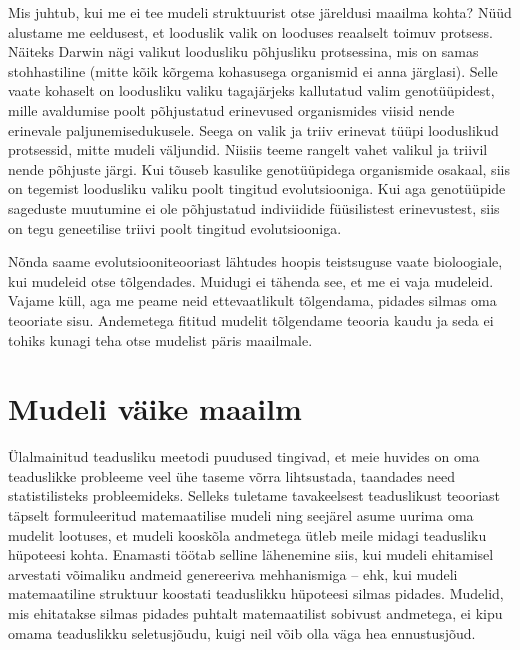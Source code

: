 \documentclass[]{book}
\begin{document}
Mis juhtub, kui me ei tee mudeli struktuurist otse järeldusi maailma kohta? Nüüd alustame me eeldusest, et looduslik valik on looduses reaalselt toimuv protsess.
Näiteks Darwin nägi valikut loodusliku põhjusliku protsessina, mis on samas stohhastiline (mitte kõik kõrgema kohasusega organismid ei anna järglasi).
Selle vaate kohaselt on loodusliku valiku tagajärjeks kallutatud valim genotüüpidest, mille avaldumise poolt põhjustatud erinevused organismides viisid nende erinevale paljunemisedukusele.
Seega on valik ja triiv erinevat tüüpi looduslikud protsessid, mitte mudeli väljundid.
Niisiis teeme rangelt vahet valikul ja triivil nende põhjuste järgi. Kui tõuseb kasulike genotüüpidega organismide osakaal, siis on tegemist loodusliku valiku poolt tingitud evolutsiooniga.
Kui aga genotüüpide sageduste muutumine ei ole põhjustatud indiviidide füüsilistest erinevustest, siis on tegu geneetilise triivi poolt tingitud evolutsiooniga.

Nõnda saame evolutsiooniteooriast lähtudes hoopis teistsuguse vaate bioloogiale, kui mudeleid otse tõlgendades.
Muidugi ei tähenda see, et me ei vaja mudeleid. Vajame küll, aga me peame neid ettevaatlikult tõlgendama, pidades silmas oma teooriate sisu.
Andemetega fititud mudelit tõlgendame teooria kaudu ja seda ei tohiks kunagi teha otse mudelist päris maailmale.

\hypertarget{mudeli-vaike-maailm}{%
\section*{Mudeli väike maailm}\label{mudeli-vaike-maailm}}

Ülalmainitud teadusliku meetodi puudused tingivad, et meie huvides on oma teaduslikke probleeme veel ühe taseme võrra lihtsustada, taandades need statistilisteks probleemideks. Selleks tuletame tavakeelsest teaduslikust teooriast täpselt formuleeritud matemaatilise mudeli ning seejärel asume uurima oma mudelit lootuses, et mudeli kooskõla andmetega ütleb meile midagi teadusliku hüpoteesi kohta. Enamasti töötab selline lähenemine siis, kui mudeli ehitamisel arvestati võimaliku andmeid genereeriva mehhanismiga -- ehk, kui mudeli matemaatiline struktuur koostati teaduslikku hüpoteesi silmas pidades. Mudelid, mis ehitatakse silmas pidades puhtalt matemaatilist sobivust andmetega, ei kipu omama teaduslikku seletusjõudu, kuigi neil võib olla väga hea ennustusjõud.
\end{document}
